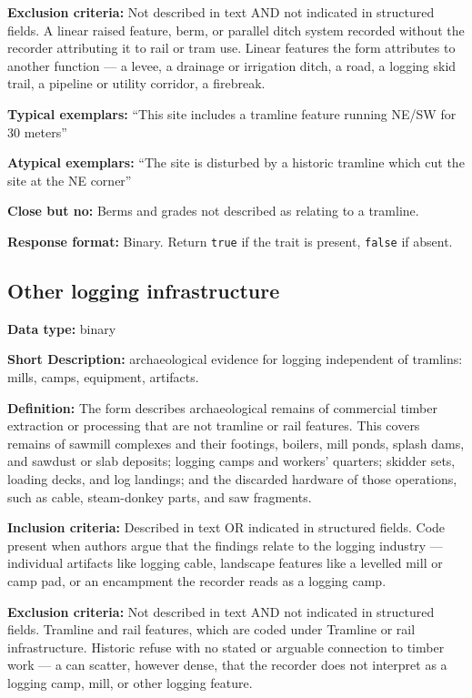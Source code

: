 \documentclass[
]{article}
\begin{document}
\textbf{Exclusion criteria:} Not described in text AND not indicated in
structured fields. A linear raised feature, berm, or parallel ditch
system recorded without the recorder attributing it to rail or tram use.
Linear features the form attributes to another function --- a levee, a
drainage or irrigation ditch, a road, a logging skid trail, a pipeline
or utility corridor, a firebreak.

\textbf{Typical exemplars:} ``This site includes a tramline feature
running NE/SW for 30 meters''

\textbf{Atypical exemplars:} ``The site is disturbed by a historic
tramline which cut the site at the NE corner''

\textbf{Close but no:} Berms and grades not described as relating to a
tramline.

\textbf{Response format:} Binary. Return \texttt{true} if the trait is
present, \texttt{false} if absent.

\subsection{Other logging
infrastructure}\label{other-logging-infrastructure}

\textbf{Data type:} binary

\textbf{Short Description:} archaeological evidence for logging
independent of tramlins: mills, camps, equipment, artifacts.

\textbf{Definition:} The form describes archaeological remains of
commercial timber extraction or processing that are not tramline or rail
features. This covers remains of sawmill complexes and their footings,
boilers, mill ponds, splash dams, and sawdust or slab deposits; logging
camps and workers' quarters; skidder sets, loading decks, and log
landings; and the discarded hardware of those operations, such as cable,
steam-donkey parts, and saw fragments.

\textbf{Inclusion criteria:} Described in text OR indicated in
structured fields. Code present when authors argue that the findings
relate to the logging industry --- individual artifacts like logging
cable, landscape features like a levelled mill or camp pad, or an
encampment the recorder reads as a logging camp.

\textbf{Exclusion criteria:} Not described in text AND not indicated in
structured fields. Tramline and rail features, which are coded under
Tramline or rail infrastructure. Historic refuse with no stated or
arguable connection to timber work --- a can scatter, however dense,
that the recorder does not interpret as a logging camp, mill, or other
logging feature.
\end{document}
